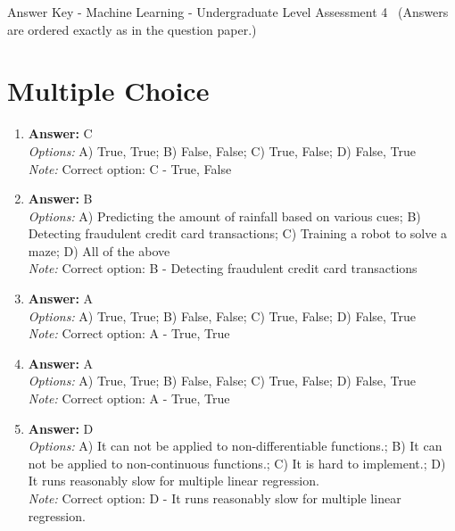 \documentclass[12pt]{article}
\begin{document}
\begin{center}
Answer Key - Machine Learning - Undergraduate Level Assessment 4 \
\small (Answers are ordered exactly as in the question paper.)
\end{center}

\section*{Multiple Choice}
\begin{enumerate}[label=\arabic*.]
\item \textbf{Answer:} C
\\ \textit{Options:} A) True, True; B) False, False; C) True, False; D) False, True
\\ \textit{Note:} Correct option: C - True, False
\item \textbf{Answer:} B
\\ \textit{Options:} A) Predicting the amount of rainfall based on various cues; B) Detecting fraudulent credit card transactions; C) Training a robot to solve a maze; D) All of the above
\\ \textit{Note:} Correct option: B - Detecting fraudulent credit card transactions
\item \textbf{Answer:} A
\\ \textit{Options:} A) True, True; B) False, False; C) True, False; D) False, True
\\ \textit{Note:} Correct option: A - True, True
\item \textbf{Answer:} A
\\ \textit{Options:} A) True, True; B) False, False; C) True, False; D) False, True
\\ \textit{Note:} Correct option: A - True, True
\item \textbf{Answer:} D
\\ \textit{Options:} A) It can not be applied to non-differentiable functions.; B) It can not be applied to non-continuous functions.; C) It is hard to implement.; D) It runs reasonably slow for multiple linear regression.
\\ \textit{Note:} Correct option: D - It runs reasonably slow for multiple linear regression.
\end{enumerate}
\end{document}
